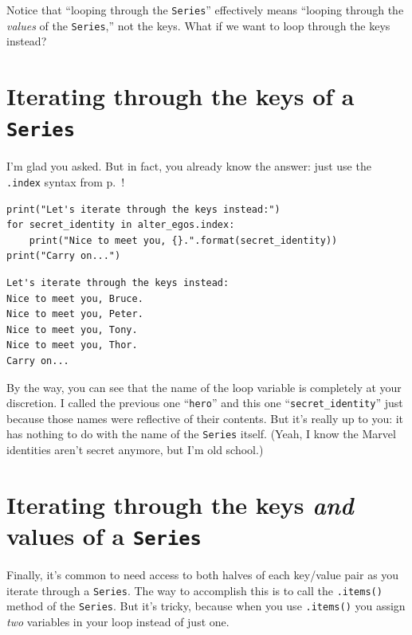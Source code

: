 Notice that ``looping through the \texttt{Series}'' effectively means ``looping
through the \textit{values} of the \texttt{Series},'' not the keys. What if we
want to loop through the keys instead?

\section[Iterating through keys of a \texttt{Series}]{Iterating through the keys of a \texttt{Series}}


I'm glad you asked. But in fact, you already know the answer: just use the
\texttt{.index} syntax from p.~\pageref{dotIndex}!

\begin{Verbatim}[fontsize=\small,samepage=true,frame=single,framesep=3mm]
print("Let's iterate through the keys instead:")
for secret_identity in alter_egos.index:
    print("Nice to meet you, {}.".format(secret_identity))
print("Carry on...")
\end{Verbatim}

\begin{Verbatim}[fontsize=\small,samepage=true,frame=leftline,framesep=5mm,framerule=1mm]
Let's iterate through the keys instead:
Nice to meet you, Bruce.
Nice to meet you, Peter.
Nice to meet you, Tony.
Nice to meet you, Thor.
Carry on...
\end{Verbatim}


By the way, you can see that the name of the loop variable is completely at
your discretion. I called the previous one ``\texttt{hero}'' and this one
``\texttt{secret\_identity}'' just because those names were reflective of their
contents. But it's really up to you: it has nothing to do with the name of the
\texttt{Series} itself. (Yeah, I know the Marvel identities aren't secret
anymore, but I'm old school.)

\section[Iterating through keys/values of a \texttt{Series}]{Iterating through the keys \textit{and} values of a \texttt{Series}}


Finally, it's common to need access to both halves of each key/value pair as
you iterate through a \texttt{Series}. The way to accomplish this is to call
the \texttt{.items()} method of the \texttt{Series}. But it's tricky, because
when you use \texttt{.items()} you assign \textit{two} variables in your loop
instead of just one.

